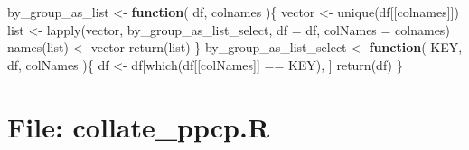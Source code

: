 \documentclass[
]{article}
\newenvironment{Shaded}{\begin{snugshade}}{\end{snugshade}}
\newcommand{\AttributeTok}[1]{\textcolor[rgb]{0.77,0.63,0.00}{#1}}
\newcommand{\ControlFlowTok}[1]{\textcolor[rgb]{0.13,0.29,0.53}{\textbf{#1}}}
\newcommand{\FunctionTok}[1]{\textcolor[rgb]{0.00,0.00,0.00}{#1}}
\newcommand{\NormalTok}[1]{#1}
\newcommand{\OtherTok}[1]{\textcolor[rgb]{0.56,0.35,0.01}{#1}}
\newcommand{\SpecialCharTok}[1]{\textcolor[rgb]{0.00,0.00,0.00}{#1}}
\begin{document}
\begin{Shaded}
\begin{Highlighting}[]
\NormalTok{by\_group\_as\_list }\OtherTok{\textless{}{-}}
  \ControlFlowTok{function}\NormalTok{(}
\NormalTok{           df,}
\NormalTok{           colnames}
\NormalTok{           )\{}
\NormalTok{    vector }\OtherTok{\textless{}{-}} \FunctionTok{unique}\NormalTok{(df[[colnames]])}
\NormalTok{    list }\OtherTok{\textless{}{-}} \FunctionTok{lapply}\NormalTok{(vector, by\_group\_as\_list\_select,}
                   \AttributeTok{df =}\NormalTok{ df,}
                   \AttributeTok{colNames =}\NormalTok{ colnames)}
    \FunctionTok{names}\NormalTok{(list) }\OtherTok{\textless{}{-}}\NormalTok{ vector}
    \FunctionTok{return}\NormalTok{(list)}
\NormalTok{  \}}
\NormalTok{by\_group\_as\_list\_select }\OtherTok{\textless{}{-}} 
  \ControlFlowTok{function}\NormalTok{(}
\NormalTok{           KEY,}
\NormalTok{           df,}
\NormalTok{           colNames}
\NormalTok{           )\{}
\NormalTok{    df }\OtherTok{\textless{}{-}}\NormalTok{ df[}\FunctionTok{which}\NormalTok{(df[[colNames]] }\SpecialCharTok{==}\NormalTok{ KEY), ]}
    \FunctionTok{return}\NormalTok{(df)}
\NormalTok{  \}}
\end{Highlighting}
\end{Shaded}

\hypertarget{file-collate_ppcp.r}{%
\section{File: collate\_ppcp.R}\label{file-collate_ppcp.r}}
\end{document}
